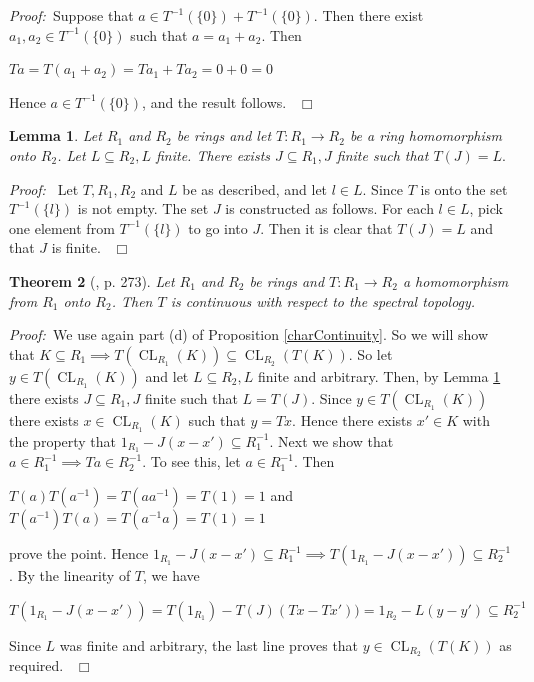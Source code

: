 \documentclass[12pt, oneside]{book}
\newtheorem{theorem}{Theorem}[subsection]
\newtheorem{lemma}[theorem]{Lemma}
\newcommand{\proof}{{\noindent \it Proof:~}}
\newcommand{\qed}{\hfill ~$\Box$\\}
\def\CL{\operatorname{CL}}
\begin{document}
\proof \space Suppose that $a \in T^{-1}(\{0\})+T^{-1}(\{0\})$. Then there exist 
$a_1, a_2 \in T^{-1}(\{0\})$ such that $a=a_1+a_2$. Then
\begin{center}
$Ta = T(a_1 + a_2) = Ta_1 + Ta_2 = 0 + 0 = 0$
\end{center}
Hence $a \in T^{-1}(\{0\})$, and the result follows.
 \qed
\begin{lemma} \label{finiteL}
\normalfont
\noindent Let $R_1$ and $R_2$ be rings and let $T: R_1 \rightarrow R_2$ be a ring homomorphism onto 
$R_2$. Let $L \subseteq R_2, L$ finite. There exists $J \subseteq R_1, J$ finite such that $T(J) = L.$
\end{lemma}
\proof \space
\noindent Let $T, R_1, R_2$ and $L$ be as described, and let $l \in L$. Since $T$ is onto the set 
$T^{-1}(\{l\})$ is not empty. The set $J$ is constructed as follows. For each $l \in L$, pick one 
element from $T^{-1}(\{l\})$ to go into $J$. Then it is clear that $T(J) = L$ and that $J$ is finite.
\qed 
\begin{theorem}[\cite{CH3}, p. 273] \label{TContinuous}
\normalfont
\noindent Let $R_1$ and $R_2$ be rings and $T: R_1 \rightarrow R_2$ a homomorphism 
from $R_1$ onto $R_2$. Then $T$ is continuous with respect to the spectral topology.
\end{theorem}
\proof \space We use again part (d) of Proposition \ref{charContinuity}. So we will show that 
 $K \subseteq R_1 \implies T(\CL_{R_1}(K)) \subseteq \CL_{R_2}(T(K)).$ 
So let $y \in T(\CL_{R_1}(K))$ and let $L \subseteq R_2, L$ finite and arbitrary. Then, by Lemma \ref{finiteL} there exists  $J \subseteq R_1, J$ finite such that $L = T(J)$. 
Since $y \in T(\CL_{R_1}(K))$ there exists 
$x \in \CL_{R_1}(K)$ such that $y = Tx$. Hence there exists $x' \in K$ with the property that
$1_{R_1} - J(x - x') \subseteq R_1^{-1}.$ Next we show that $a \in R_1^{-1} \implies Ta \in R_2^{-1}$. 
To see this, let $a \in R^{-1}_1$. Then 
\begin{center}
$T(a)T(a^{-1}) = T(aa^{-1}) = T(1) = 1$ and $T(a^{-1})T(a) = T(a^{-1}a) = T(1) = 1$
\end{center}
prove the point. Hence 
$1_{R_1} - J(x - x') \subseteq R_1^{-1} \implies T(1_{R_1} - J(x - x')) \subseteq R_2^{-1}$. 
By the linearity of $T$, we have
\begin{center}
$T(1_{R_1} - J(x - x')) = T(1_{R_1}) - T(J)(Tx - Tx')) = 1_{R_2} - L(y - y') \subseteq R_2^{-1}$
\end{center}
\noindent Since $L$ was finite and arbitrary, the last line proves that $y \in \CL_{R_2}(T(K))$ 
as required.
\qed
\end{document}
